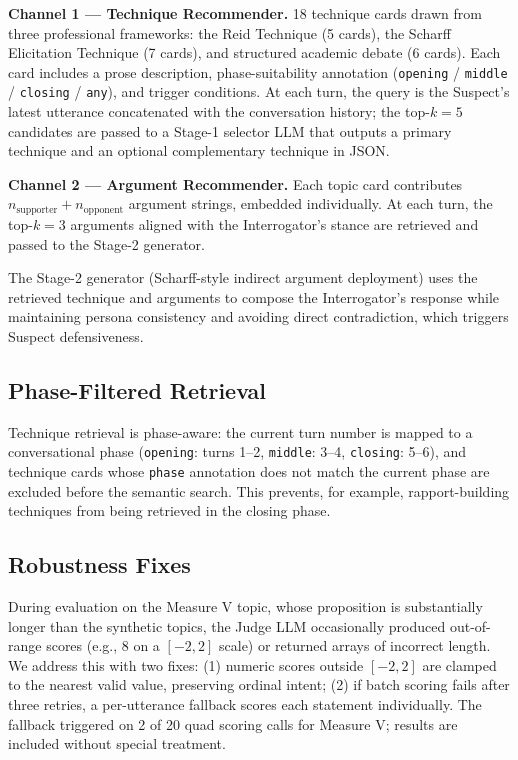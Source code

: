 \documentclass[sigconf]{acmart}
\begin{document}
\textbf{Channel 1 --- Technique Recommender.} 18 technique cards drawn from
three professional frameworks: the Reid Technique (5 cards), the Scharff Elicitation
Technique (7 cards), and structured academic debate (6 cards). Each card
includes a prose description, phase-suitability annotation
(\texttt{opening} / \texttt{middle} / \texttt{closing} / \texttt{any}), and
trigger conditions. At each turn, the query is the Suspect's latest utterance
concatenated with the conversation history; the top-$k=5$ candidates are passed
to a Stage-1 selector LLM that outputs a primary technique and an optional
complementary technique in JSON.

\textbf{Channel 2 --- Argument Recommender.} Each topic card contributes
$n_{\text{supporter}} + n_{\text{opponent}}$ argument strings, embedded
individually. At each turn, the top-$k=3$ arguments aligned with the
Interrogator's stance are retrieved and passed to the Stage-2 generator.

The Stage-2 generator (Scharff-style indirect argument deployment) uses
the retrieved technique and arguments to compose the Interrogator's response
while maintaining persona consistency and avoiding direct contradiction, which
triggers Suspect defensiveness.

\subsection{Phase-Filtered Retrieval}
Technique retrieval is phase-aware: the current turn number is mapped to a
conversational phase (\texttt{opening}: turns 1--2, \texttt{middle}: 3--4,
\texttt{closing}: 5--6), and technique cards whose \texttt{phase} annotation
does not match the current phase are excluded before the semantic search.
This prevents, for example, rapport-building techniques from being retrieved
in the closing phase.

\subsection{Robustness Fixes}
\label{sec:robustness}
During evaluation on the Measure V topic, whose proposition is substantially
longer than the synthetic topics, the Judge LLM occasionally produced
out-of-range scores (e.g., 8 on a $[-2, 2]$ scale) or returned arrays of
incorrect length. We address this with two fixes: (1) numeric scores outside
$[-2, 2]$ are clamped to the nearest valid value, preserving ordinal intent;
(2) if batch scoring fails after three retries, a per-utterance fallback scores
each statement individually. The fallback triggered on 2 of 20 quad scoring
calls for Measure V; results are included without special treatment.
\end{document}
